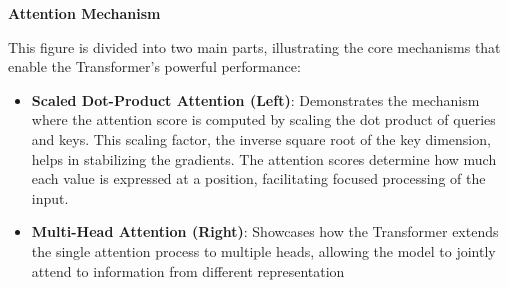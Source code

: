 \documentclass[final,t]{beamer}
\begin{document}
\begin{frame}[fragile]{}
\begin{columns}[t]
\begin{column}{.3\linewidth}
\begin{ntblock}
	\vspace{1em}
	\textbf{Attention Mechanism}

	This figure is divided into two main parts, illustrating the core mechanisms that enable the Transformer's powerful performance:
	\begin{itemize}
	\item \textbf{Scaled Dot-Product Attention (Left)}: Demonstrates the mechanism where the attention score is computed by scaling the dot product of queries and keys. This scaling factor, the inverse square root of the key dimension, helps in stabilizing the gradients. The attention scores determine how much each value is expressed at a position, facilitating focused processing of the input.
	\item \textbf{Multi-Head Attention (Right)}: Showcases how the Transformer extends the single attention process to multiple heads, allowing the model to jointly attend to information from different representation
	\end{itemize}
	\end{ntblock}
    \end{column}


\end{columns}
\end{frame}
\end{document}
